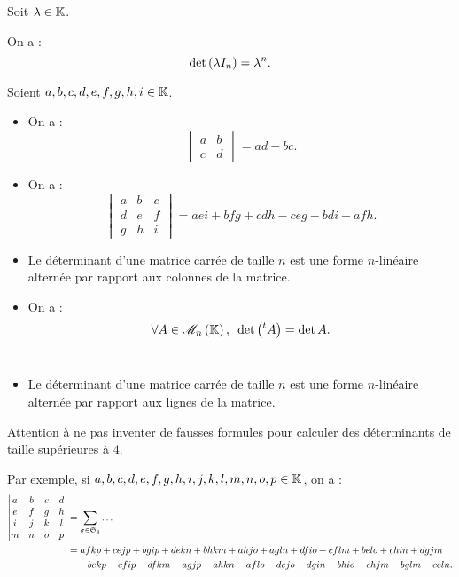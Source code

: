 \begin{ex}
Soit \(\lambda\in\mathbb{K}\).

On a : \[\det\left(\lambda I_n\right)=\lambda^n.\]
\end{ex}

\begin{ex}
Soient \(a,b,c,d,e,f,g,h,i\in\mathbb{K}\).

\begin{itemize}
    \item On a : \[\begin{vmatrix}
        a & b \\
        c & d
    \end{vmatrix}=ad-bc.\]
    \item On a : \[\begin{vmatrix}
        a & b & c \\
        d & e & f \\
        g & h & i
    \end{vmatrix}=aei+bfg+cdh-ceg-bdi-afh.\]
\end{itemize}
\end{ex}

\begin{prop}
\begin{itemize}
    \item Le déterminant d'une matrice carrée de taille \(n\) est une forme \(n\)-linéaire alternée par rapport aux colonnes de la matrice. \\
    \item On a : \[\quantifs{\forall A\in\M{n}}\det\paren{\trans{A}}=\det A.\]~
    \item Le déterminant d'une matrice carrée de taille \(n\) est une forme \(n\)-linéaire alternée par rapport aux lignes de la matrice.
\end{itemize}
\end{prop}

\begin{rem}
Attention à ne pas inventer de fausses formules pour calculer des déterminants de taille supérieures à \(4\).

Par exemple, si \(a,b,c,d,e,f,g,h,i,j,k,l,m,n,o,p\in\mathbb{K}\), on a : \[\begin{aligned}
\begin{vmatrix}
a & b & c & d \\
e & f & g & h \\
i & j & k & l \\
m & n & o & p
\end{vmatrix}&=\sum_{\sigma\in\S{4}}\dots \\
&=afkp+cejp+bgip+dekn+bhkm+ahjo+agln+dfio+cflm+belo+chin+dgjm \\
&\color{white}=\color{black}-bekp-cfip-dfkm-agjp-ahkn-aflo-dejo-dgin-bhio-chjm-bglm-celn.
\end{aligned}\]
\end{rem}